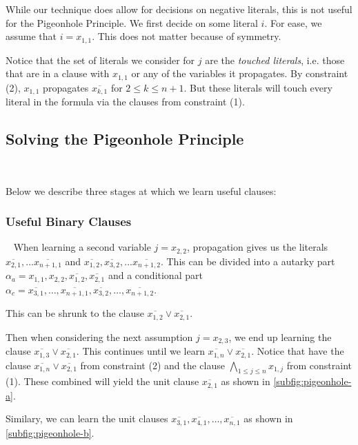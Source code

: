 While our technique does allow for decisions on negative literals, this is not useful for the Pigeonhole Principle. We first decide on some literal $i$. For ease, we assume that $i = x_{1, 1}$. This does not matter because of symmetry.

Notice that the set of literals we consider for $j$ are the \emph{touched literals}, i.e. those that are in a clause with $x_{1, 1}$ or any of the variables it propagates. By constraint (2), $x_{1, 1}$ propagates $\overline{x_{k, 1}}$ for $2 \leq k \leq n + 1$. But these literals will touch every literal in the formula via the clauses from constraint (1). 


\subsection{Solving the Pigeonhole Principle}~\label{subsec:solvingpigeonhole}

Below we describe three stages at which we learn useful clauses:


\subsubsection{Useful Binary Clauses}~\label{subec:usefulbinaryclauses} When learning a second variable $j= x_{2, 2}$, propagation gives us the literals $\overline{x_{2, 1}}, ... \overline{x_{n+1, 1}}$ and $\overline{x_{1, 2}}, \overline{x_{3, 2}}, ... \overline{x_{n+1, 2}}$. This can be divided into a autarky part $\alpha_a = x_{1, 1}, x_{2, 2}, \overline{x_{1, 2}}, \overline{x_{2, 1}}$ and a conditional part $\alpha_c = \overline{x_{3, 1}}, \ldots, \overline{x_{n+1, 1}}, \overline{x_{3, 2}}, \ldots, \overline{x_{n+1, 2}}$.

This can be shrunk to the clause $\overline{x_{1, 2}} \lor \overline{x_{2, 1}}$.

Then when considering the next assumption $j = x_{2, 3}$, we end up learning the clause $\overline{x_{1, 3}} \lor \overline{x_{2, 1}}$. This continues until we learn $\overline{x_{1, n}} \lor \overline{x_{2, 1}}$. Notice that have the clause $\overline{x_{1, n}} \lor \overline{x_{2, 1}}$ from constraint (2) and the clause $\bigwedge_{1 \leq j \leq n} x_{1, j}$ from constraint (1). These combined will yield the unit clause $\overline{x_{2, 1}}$ as shown in \autoref{subfig:pigeonhole-a}.

Similary, we can learn the unit clauses $\overline{x_{3, 1}}, \overline{x_{4, 1}}, \ldots, \overline{x_{n, 1}}$ as shown in \autoref{subfig:pigeonhole-b}.


